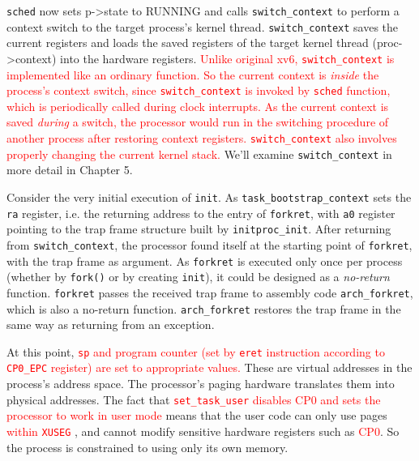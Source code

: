 \documentclass{report}
\def \hilite#1{\textcolor{red}{#1}}
\newenvironment{hilight}{\color{red}}{\color{black}}
\begin{document}
	\texttt{sched} now sets p->state to RUNNING and calls \texttt{switch\_context} to perform a
	context switch to the target process’s kernel thread. \texttt{switch\_context} saves the current registers
	and loads the saved registers of the target kernel thread (proc->context) into the
	hardware registers. \hilite{
		Unlike original xv6, \texttt{switch\_context} is implemented like an ordinary function.
		So the current context is \emph{inside} the process's context switch,
		since \texttt{switch\_context} is invoked by \texttt{sched} function, which is periodically called
		during clock interrupts.  As the current context is saved \emph{during} a switch, the processor
		would run in the switching procedure of another process after restoring context registers.
		\texttt{switch\_context} also involves properly changing the current kernel stack.
	} We’ll examine \texttt{switch\_context} in more detail in Chapter 5.
	
	\begin{hilight}
		Consider the very initial execution of \texttt{init}. As \texttt{task\_bootstrap\_context}
		 sets the \texttt{ra} register, i.e. the returning address to the entry of \texttt{forkret},
		with \texttt{a0} register pointing to the trap frame structure built by \texttt{initproc\_init}.
		After returning from \texttt{switch\_context}, the processor found itself at the starting point
		of \texttt{forkret},
		with the trap frame as argument.  As \texttt{forkret} is executed only once
		per process (whether by \texttt{fork()} or by creating \texttt{init}), it could be designed as a
		\emph{no-return} function.  \texttt{forkret} passes the received trap frame to assembly code
		\texttt{arch\_forkret}, which is also a no-return function.  \texttt{arch\_forkret}
		 restores the trap frame in the same way as returning from an exception.
	\end{hilight}
	
	At this point, \hilite{
		\texttt{sp} and program counter (set by \texttt{eret} instruction
		according to \texttt{CP0\_EPC} register) are set to appropriate values.
	} These are virtual addresses
	in the process’s address space. The processor’s paging hardware translates them into
	physical addresses. The fact that \hilite{
		\texttt{set\_task\_user}
		\marginpar{
			\footnotesize\ttfamily
			arch/mips/sched/\\task.c:53
		} disables CP0 and sets the processor to work in user mode
	}
	means that the user code can only use pages \hilite{
		within \texttt{XUSEG}
		\marginpar{
			\footnotesize\ttfamily
			\hilite{
				arch/mips/include\\
				asm/addrspace.h:44
			}
		}
	},
	and cannot modify sensitive hardware registers such as \hilite{CP0}.
	So the process is constrained to using only its own memory.
	
\end{document}
